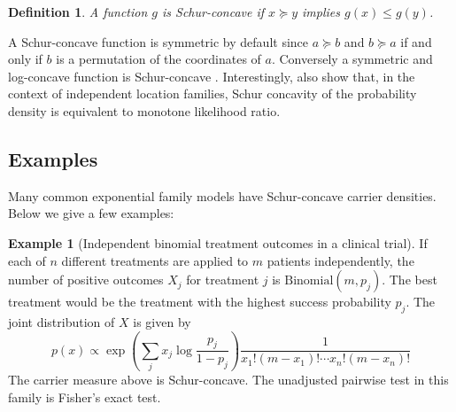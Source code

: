 \documentclass[aos, authoryear]{imsart}
\newtheorem{definition}{Definition}
\theoremstyle{definition}
\newtheorem{example}{Example}
\theoremstyle{custom}
\begin{document}
\begin{definition}
A function $g$ is Schur-concave if $x \succeq y$ implies $g\left(x\right) \le g\left(y\right)$.
\end{definition}

A Schur-concave function is symmetric by default since $a \succeq b$ and $b \succeq a$ if and only if $b$ is a permutation of the coordinates of $a$. Conversely a symmetric and log-concave function is Schur-concave \citep{Marshall:2010hb}. Interestingly, \citet{Gupta:1984fw} also show that, in the context of independent location families, Schur concavity of the probability density is equivalent to monotone likelihood ratio.

\subsection{Examples}

Many common exponential family models have Schur-concave carrier densities. Below we give a few examples:

\begin{example}[Independent binomial treatment outcomes in a clinical trial]
 If each of $n$ different treatments are applied to $m$ patients independently, the number of positive outcomes $X_j$ for treatment $j$ is $\text{Binomial}\left(m, p_j\right)$. The best treatment would be the treatment with the highest success probability $p_j$. The joint distribution of $X$ is given by
\[p\left(x\right) \propto \exp\left(\sum_j x_j \log\frac{p_j}{1-p_j}\right) \frac{1}{x_1! \left(m-x_1\right)! \cdots x_n! \left(m-x_n\right)!}\]
The carrier measure above is Schur-concave. The unadjusted pairwise test in this family is Fisher's exact test.
\end{example}
\end{document}
